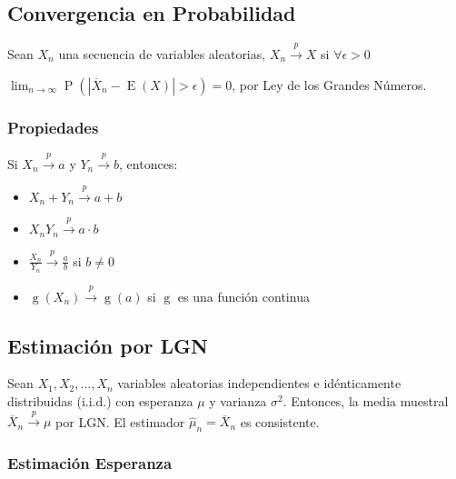 \documentclass[
]{article}
\providecommand{\tightlist}{%
  \setlength{\itemsep}{0pt}\setlength{\parskip}{0pt}}
\begin{document}
\hypertarget{convergencia-en-probabilidad}{%
\subsection{Convergencia en
Probabilidad}\label{convergencia-en-probabilidad}}

Sean \(X_{n}\) una secuencia de variables aleatorias,
\(X_{n}\xrightarrow{p} X\) si \(\forall \epsilon > 0\)

\(\lim _{n\rightarrow \infty }\operatorname {P} \left( |\overline{X}_{n} - \operatorname{E}(X) | > \epsilon \right) =0\),
por Ley de los Grandes Números.

\hypertarget{propiedades}{%
\subsubsection{Propiedades}\label{propiedades}}

Si \(X_{n}\xrightarrow{p} a\) y \(Y_{n}\xrightarrow{p} b\), entonces:

\begin{itemize}
\tightlist
\item
  \(X_{n}+Y_{n}\xrightarrow{p} a+b\)
\item
  \(X_{n}Y_{n}\xrightarrow{p} a \cdot b\)
\item
  \(\frac{X_{n}}{Y_{n}}\xrightarrow{p} \frac{a}{b}\) si \(b \neq 0\)
\item
  \(\operatorname{g}(X_{n})\xrightarrow{p} \operatorname{g}(a)\) si
  \(\operatorname{g}\) es una función continua
\end{itemize}

\hypertarget{estimaciuxf3n-por-lgn}{%
\subsection{Estimación por LGN}\label{estimaciuxf3n-por-lgn}}

Sean \(X_{1},X_{2},\dots ,X_{n}\) variables aleatorias independientes e
idénticamente distribuidas (i.i.d.) con esperanza \(\mu\) y varianza
\(\sigma^{2}\). Entonces, la media muestral
\(\overline{X}_{n} \xrightarrow{p} \mu\) por LGN. El estimador
\(\hat{\mu}_{n}=\overline{X}_{n}\) es consistente.

\hypertarget{estimaciuxf3n-esperanza}{%
\subsubsection{Estimación Esperanza}\label{estimaciuxf3n-esperanza}}
\end{document}

